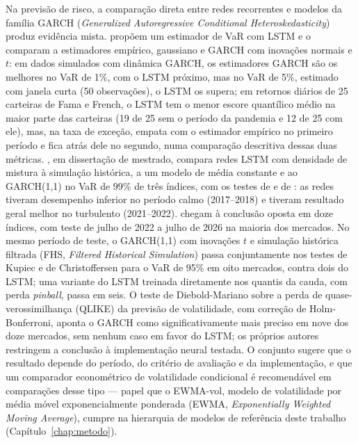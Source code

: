 Na previsão de risco, a comparação direta entre redes recorrentes e modelos da família GARCH (\textit{Generalized Autoregressive Conditional Heteroskedasticity}) produz evidência mista.  propõem um estimador de VaR com LSTM e o comparam a estimadores empírico, gaussiano e GARCH com inovações normais e \(t\): em dados simulados com dinâmica GARCH, os estimadores GARCH são os melhores no VaR de 1\%, com o LSTM próximo, mas no VaR de 5\%, estimado com janela curta (50 observações), o LSTM os supera; em retornos diários de 25 carteiras de Fama e French, o LSTM tem o menor escore quantílico médio na maior parte das carteiras (19 de 25 sem o período da pandemia e 12 de 25 com ele), mas, na taxa de exceção, empata com o estimador empírico no primeiro período e fica atrás dele no segundo, numa comparação descritiva dessas duas métricas. , em dissertação de mestrado, compara redes LSTM com densidade de mistura à simulação histórica, a um modelo de média constante e ao GARCH(1,1) no VaR de 99\% de três índices, com os testes de  e de : as redes tiveram desempenho inferior no período calmo (2017--2018) e tiveram resultado geral melhor no turbulento (2021--2022).  chegam à conclusão oposta em doze índices, com teste de julho de 2022 a julho de 2026 na maioria dos mercados. No mesmo período de teste, o GARCH(1,1) com inovações \(t\) e simulação histórica filtrada (FHS, \textit{Filtered Historical Simulation}) passa conjuntamente nos testes de Kupiec e de Christoffersen para o VaR de 95\% em oito mercados, contra dois do LSTM; uma variante do LSTM treinada diretamente nos quantis da cauda, com perda \textit{pinball}, passa em seis. O teste de Diebold-Mariano sobre a perda de quase-verossimilhança (QLIKE) da previsão de volatilidade, com correção de Holm-Bonferroni, aponta o GARCH como significativamente mais preciso em nove dos doze mercados, sem nenhum caso em favor do LSTM; os próprios autores restringem a conclusão à implementação neural testada. O conjunto sugere que o resultado depende do período, do critério de avaliação e da implementação, e que um comparador econométrico de volatilidade condicional é recomendável em comparações desse tipo --- papel que o EWMA-vol, modelo de volatilidade por média móvel exponencialmente ponderada (EWMA, \textit{Exponentially Weighted Moving Average}), cumpre na hierarquia de modelos de referência deste trabalho (Capítulo~\ref{chap:metodo}).

